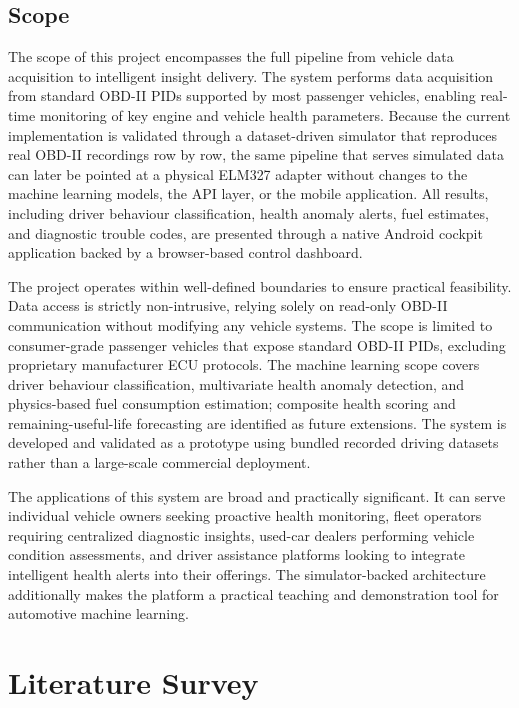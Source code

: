 \documentclass[10pt,a4paper]{report}
\begin{document}
\section{Scope}

The scope of this project encompasses the full pipeline from vehicle data acquisition to intelligent insight delivery. The system performs data acquisition from standard OBD-II PIDs supported by most passenger vehicles, enabling real-time monitoring of key engine and vehicle health parameters. Because the current implementation is validated through a dataset-driven simulator that reproduces real OBD-II recordings row by row, the same pipeline that serves simulated data can later be pointed at a physical ELM327 adapter without changes to the machine learning models, the API layer, or the mobile application. All results, including driver behaviour classification, health anomaly alerts, fuel estimates, and diagnostic trouble codes, are presented through a native Android cockpit application backed by a browser-based control dashboard.
\par
The project operates within well-defined boundaries to ensure practical feasibility. Data access is strictly non-intrusive, relying solely on read-only OBD-II communication without modifying any vehicle systems. The scope is limited to consumer-grade passenger vehicles that expose standard OBD-II PIDs, excluding proprietary manufacturer ECU protocols. The machine learning scope covers driver behaviour classification, multivariate health anomaly detection, and physics-based fuel consumption estimation; composite health scoring and remaining-useful-life forecasting are identified as future extensions. The system is developed and validated as a prototype using bundled recorded driving datasets rather than a large-scale commercial deployment.
\par
The applications of this system are broad and practically significant. It can serve individual vehicle owners seeking proactive health monitoring, fleet operators requiring centralized diagnostic insights, used-car dealers performing vehicle condition assessments, and driver assistance platforms looking to integrate intelligent health alerts into their offerings. The simulator-backed architecture additionally makes the platform a practical teaching and demonstration tool for automotive machine learning.


\chapter{Literature Survey}
\end{document}
